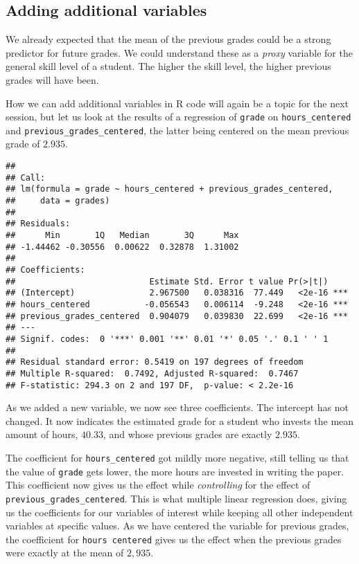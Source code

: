 \documentclass[
]{book}
\begin{document}
\hypertarget{adding-additional-variables}{%
\subsection{Adding additional variables}\label{adding-additional-variables}}

We already expected that the mean of the previous grades could be a strong
predictor for future grades. We could understand these as a \emph{proxy} variable for
the general skill level of a student. The higher the skill level, the higher
previous grades will have been.

How we can add additional variables in R code will again be a topic for the next
session, but let us look at the results of a regression of \texttt{grade} on
\texttt{hours\_centered} and \texttt{previous\_grades\_centered}, the latter being centered on the
mean previous grade of \(2.935\).

\begin{verbatim}
## 
## Call:
## lm(formula = grade ~ hours_centered + previous_grades_centered, 
##     data = grades)
## 
## Residuals:
##      Min       1Q   Median       3Q      Max 
## -1.44462 -0.30556  0.00622  0.32878  1.31002 
## 
## Coefficients:
##                           Estimate Std. Error t value Pr(>|t|)    
## (Intercept)               2.967500   0.038316  77.449   <2e-16 ***
## hours_centered           -0.056543   0.006114  -9.248   <2e-16 ***
## previous_grades_centered  0.904079   0.039830  22.699   <2e-16 ***
## ---
## Signif. codes:  0 '***' 0.001 '**' 0.01 '*' 0.05 '.' 0.1 ' ' 1
## 
## Residual standard error: 0.5419 on 197 degrees of freedom
## Multiple R-squared:  0.7492, Adjusted R-squared:  0.7467 
## F-statistic: 294.3 on 2 and 197 DF,  p-value: < 2.2e-16
\end{verbatim}

As we added a new variable, we now see three coefficients.
The intercept has not changed. It now indicates the estimated grade for a
student who invests the mean amount of hours, \(40.33\), and whose previous grades
are exactly \(2.935\).

The coefficient for \texttt{hours\_centered} got mildly more negative, still telling us
that the value of \texttt{grade} gets lower, the more hours are invested in writing the
paper. This coefficient now gives us the effect while \emph{controlling} for the
effect of \texttt{previous\_grades\_centered}. This is what multiple linear regression
does, giving us the coefficients for our variables of interest while keeping all
other independent variables at specific values. As we have centered the variable
for previous grades, the coefficient for \texttt{hours\ centered} gives us the effect
when the previous grades were exactly at the mean of \(2,935\).
\end{document}
